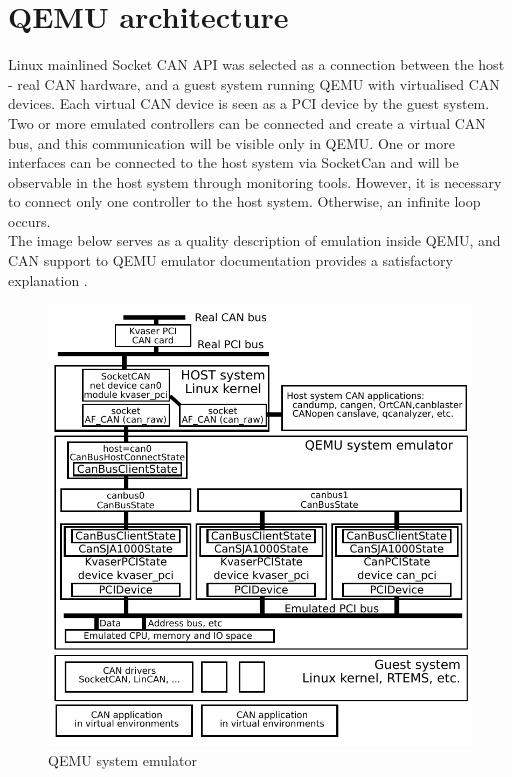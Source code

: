 \documentclass{ctuthesis}
\begin{document}
 \section{QEMU architecture}
  Linux mainlined Socket CAN API was selected as a connection between the host - real CAN hardware, and a guest system running QEMU with virtualised CAN devices. Each virtual CAN device is seen as a PCI device by the guest system. \\
  Two or more emulated controllers can be connected and create a virtual CAN bus, and this communication will be visible only in QEMU. One or more interfaces can be connected to the host system via SocketCan and will be observable in the host system through monitoring tools. However, it is necessary to connect only one controller to the host system. Otherwise, an infinite loop occurs. \\
  The image below serves as a quality description of emulation inside QEMU, and CAN support to QEMU emulator documentation provides a satisfactory explanation \cite[page 2-4]{qemu-mainline}.
  \begin{figure}[H]
  \includegraphics[width=1\textwidth]{qemu-can-bus}
  \caption{QEMU system emulator \cite{qemu-canbusexplain}}
  \end{figure}
 
\end{document}
